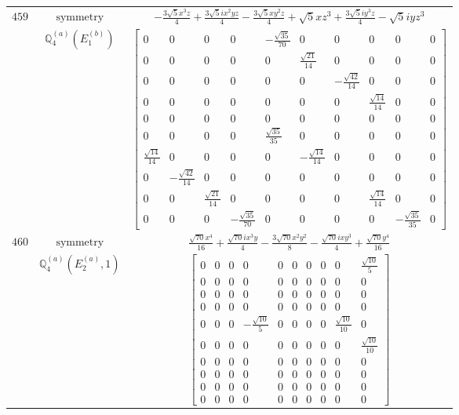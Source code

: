 \documentclass[fleqn,8pt,landscape]{jsarticle}
\begin{document}
\begin{longtable}{ccc}
$ 459 $ & $ \text{symmetry} $ & $ - \frac{3 \sqrt{5} x^{3} z}{4} + \frac{3 \sqrt{5} i x^{2} y z}{4} - \frac{3 \sqrt{5} x y^{2} z}{4} + \sqrt{5} x z^{3} + \frac{3 \sqrt{5} i y^{3} z}{4} - \sqrt{5} i y z^{3} $ \\
$  $ & $ \mathbb{Q}_{4}^{(a)}(E_{1}^{(b)}) $ & $ \begin{bmatrix} 0 & 0 & 0 & 0 & - \frac{\sqrt{35}}{70} & 0 & 0 & 0 & 0 & 0 \\ 0 & 0 & 0 & 0 & 0 & \frac{\sqrt{21}}{14} & 0 & 0 & 0 & 0 \\ 0 & 0 & 0 & 0 & 0 & 0 & - \frac{\sqrt{42}}{14} & 0 & 0 & 0 \\ 0 & 0 & 0 & 0 & 0 & 0 & 0 & \frac{\sqrt{14}}{14} & 0 & 0 \\ 0 & 0 & 0 & 0 & 0 & 0 & 0 & 0 & 0 & 0 \\ 0 & 0 & 0 & 0 & \frac{\sqrt{35}}{35} & 0 & 0 & 0 & 0 & 0 \\ \frac{\sqrt{14}}{14} & 0 & 0 & 0 & 0 & - \frac{\sqrt{14}}{14} & 0 & 0 & 0 & 0 \\ 0 & - \frac{\sqrt{42}}{14} & 0 & 0 & 0 & 0 & 0 & 0 & 0 & 0 \\ 0 & 0 & \frac{\sqrt{21}}{14} & 0 & 0 & 0 & 0 & \frac{\sqrt{14}}{14} & 0 & 0 \\ 0 & 0 & 0 & - \frac{\sqrt{35}}{70} & 0 & 0 & 0 & 0 & - \frac{\sqrt{35}}{35} & 0 \end{bmatrix} $ \\ \hline
$ 460 $ & $ \text{symmetry} $ & $ \frac{\sqrt{70} x^{4}}{16} + \frac{\sqrt{70} i x^{3} y}{4} - \frac{3 \sqrt{70} x^{2} y^{2}}{8} - \frac{\sqrt{70} i x y^{3}}{4} + \frac{\sqrt{70} y^{4}}{16} $ \\
$  $ & $ \mathbb{Q}_{4}^{(a)}(E_{2}^{(a)},1) $ & $ \begin{bmatrix} 0 & 0 & 0 & 0 & 0 & 0 & 0 & 0 & 0 & \frac{\sqrt{10}}{5} \\ 0 & 0 & 0 & 0 & 0 & 0 & 0 & 0 & 0 & 0 \\ 0 & 0 & 0 & 0 & 0 & 0 & 0 & 0 & 0 & 0 \\ 0 & 0 & 0 & 0 & 0 & 0 & 0 & 0 & 0 & 0 \\ 0 & 0 & 0 & - \frac{\sqrt{10}}{5} & 0 & 0 & 0 & 0 & \frac{\sqrt{10}}{10} & 0 \\ 0 & 0 & 0 & 0 & 0 & 0 & 0 & 0 & 0 & \frac{\sqrt{10}}{10} \\ 0 & 0 & 0 & 0 & 0 & 0 & 0 & 0 & 0 & 0 \\ 0 & 0 & 0 & 0 & 0 & 0 & 0 & 0 & 0 & 0 \\ 0 & 0 & 0 & 0 & 0 & 0 & 0 & 0 & 0 & 0 \\ 0 & 0 & 0 & 0 & 0 & 0 & 0 & 0 & 0 & 0 \end{bmatrix} $ \\ \hline

\end{longtable}
\end{document}
